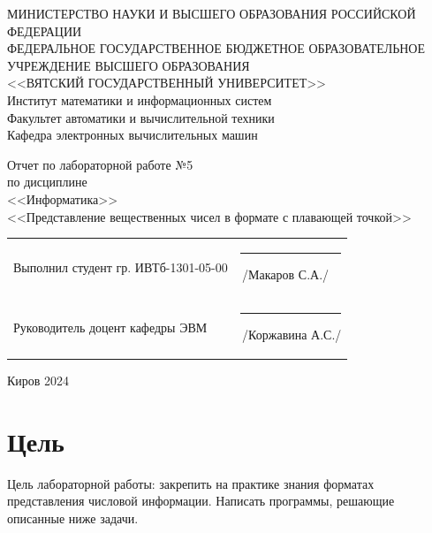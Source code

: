 \documentclass[a4paper,14pt]{extarticle}
\begin{document}
	
	\newpage\thispagestyle{empty}
	\begin{center}
		\MakeUppercase{
			Министерство науки и высшего образования Российской Федерации\\
			Федеральное государственное бюджетное образовательное учреждение высшего образования\\
			<<Вятский Государственный Университет>>\\
		}
		Институт математики и информационных систем\\
		Факультет автоматики и вычислительной техники\\
		Кафедра электронных вычислительных машин
	\end{center}
	\vfill
	
	\begin{center}
		Отчет по лабораторной работе №5\\
		по дисциплине\\
		<<Информатика>>\\
		<<Представление вещественных чисел в формате с плавающей точкой>>
	\end{center}
	\vfill
	
	\noindent
	\begin{tabular}{ll}
		Выполнил студент гр. ИВТб-1301-05-00 \hspace{5mm} &
		\rule[-1mm]{25mm}{0.10mm}\,/Макаров С.А./\\
		
		Руководитель доцент кафедры ЭВМ & \rule[-1mm]{25mm}{0.10mm}\,/Коржавина А.С./\\
	\end{tabular}
	
	\vfill
	\begin{center}
		Киров 2024
	\end{center}
	
	\newpage
	\section*{Цель}
	Цель лабораторной работы: закрепить на практике знания форматах представления числовой информации. Написать программы, решающие описанные ниже задачи.
	
\end{document}
